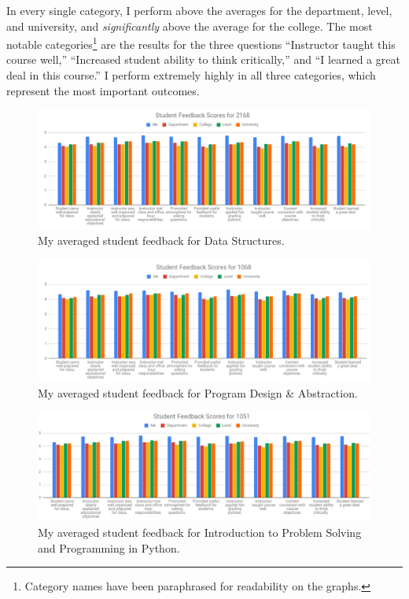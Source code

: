 \documentclass[10pt]{article}
\begin{document}
In every single category, I perform above the averages for the department, level, and university, and \textit{significantly} above the average for the college.
The most notable categories\footnote{Category names have been paraphrased for readability on the graphs.} are the results for the three questions ``Instructor taught this course well,'' ``Increased student ability to think critically,'' and ``I learned a great deal in this course.''
I perform extremely highly in all three categories, which represent the most important outcomes.

\begin{figure}
	\centering
	\includegraphics[width=1\linewidth]{2168SFF}
	\caption{My averaged student feedback for Data Structures. }
	\label{fig:2168sff}
\end{figure}


\begin{figure}
	\centering
	\includegraphics[width=1\linewidth]{1068SFF}
	\caption{My averaged student feedback for Program Design \& Abstraction.}
	\label{fig:1068sff}
\end{figure}




\begin{figure}
	\centering
	\includegraphics[width=1\linewidth]{1051SFF}
	\caption{My averaged student feedback for Introduction to Problem Solving and Programming in Python.}
	\label{fig:1051sff}
\end{figure}
\end{document}
